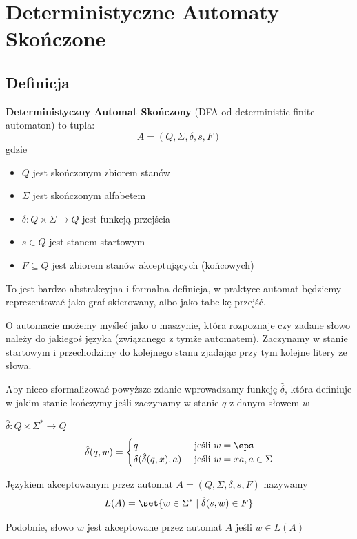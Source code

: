 \section{Deterministyczne Automaty Skończone}
\subsection{Definicja}
\begin{definition}
	\textbf{Deterministyczny Automat Skończony} (DFA od deterministic finite automaton) to tupla:
	\[
		A = (Q, \Sigma, \delta, s, F)
	\]
	gdzie
	\begin{itemize}
		\item \( Q \) jest skończonym zbiorem stanów
		\item \( \Sigma \) jest skończonym alfabetem
		\item \( \delta: Q \times \Sigma \rightarrow Q \) jest funkcją przejścia
		\item \( s \in Q \) jest stanem startowym
		\item \( F \subseteq Q \) jest zbiorem stanów akceptujących (końcowych)
	\end{itemize}
\end{definition}

To jest bardzo abstrakcyjna i formalna definicja, w praktyce automat będziemy reprezentować jako graf skierowany, albo jako tabelkę przejść.

O automacie możemy myśleć jako o maszynie, która rozpoznaje czy zadane słowo należy do jakiegoś języka (związanego z tymże automatem). Zaczynamy w stanie startowym i przechodzimy do kolejnego stanu zjadając przy tym kolejne litery ze słowa.

Aby nieco sformalizować powyższe zdanie wprowadzamy funkcję \( \hat \delta \), która definiuje w jakim stanie kończymy jeśli zaczynamy w stanie \( q \) z danym słowem \( w \)
\begin{definition}
	\( \hat \delta : Q \times \Sigma^* \rightarrow Q \)
	\[
		\hat \delta(q, w) = \begin{cases}
			q                            & \text{ jeśli } w = \eps             \\
			\delta(\hat \delta(q, x), a) & \text{ jeśli } w = xa, a \in \Sigma \\
		\end{cases}
	\]
\end{definition}

\begin{definition}
	Językiem akceptowanym przez automat \( A = (Q, \Sigma, \delta, s, F) \) nazywamy
	\[
		L(A) = \set{w \in \Sigma^* \mid \hat \delta(s, w) \in F}
	\]

	Podobnie, słowo \( w \) jest akceptowane przez automat \( A \) jeśli \( w \in L(A) \)
\end{definition}


